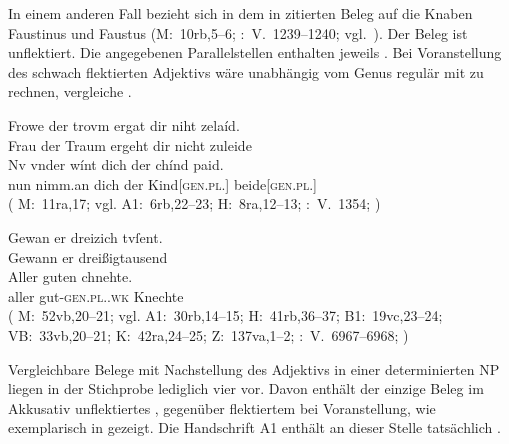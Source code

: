 In einem anderen Fall bezieht sich in dem in  zitierten
Beleg   auf die Knaben Faustinus und Faustus
(M:~10rb,5--6; \KC:~V.~1239--1240; vgl.~\cite[104]{schroeder1895}). Der Beleg
ist unflektiert. Die angegebenen Parallelstellen enthalten
jeweils  . Bei Voranstellung des
schwach flektierten Adjektivs wäre unabhängig vom
Genus regulär mit  zu rechnen, vergleiche
.

\begin{exe}
\ex \label{ex:chindpaid}
\begin{xlist}
	\ex \label{ex:chindpaid_1}
		\gll Frowe der trovm ergat dir niht zelaíd. \\
			Frau der Traum ergeht dir nicht zuleide \\
	\sn \gll Nv {vnder wínt} dich der chínd paid. \\
			nun nimm.an dich der Kind[\textsc{gen.pl.\NeutM}]
			beide[\textsc{gen.pl.\NeutM}] \\
		\trans {}
			(%
				M:~11ra,17; vgl.
				A1:~6rb,22--23;
				H:~8ra,12--13;
				\KC:~V.~1354;
				\cite[106]{schroeder1895}%
			)

	\ex \label{ex:chindpaid_2}
		\gll Gewan er {dreizich tvſent}. \\
			Gewann er dreißigtausend \\
	\sn \gll Aller guten chnehte. \\
			aller gut-\textsc{gen.pl.\MascM.wk} Knechte \\
		\trans {}
			(%
				M:~52vb,20--21; vgl.
				A1:~30rb,14--15;
				H:~41rb,36--37;
				B1:~19vc,23--24;
				VB:~33vb,20--21;
				K:~42ra,24--25;
				Z:~137va,1--2;
				\KC:~V.~6967--6968;
				\cite[209]{schroeder1895}%
			)
\end{xlist}
\end{exe}

Vergleichbare Belege mit Nachstellung des Adjektivs in
einer determinierten NP liegen in der Stichprobe
lediglich vier vor. Davon enthält der einzige Beleg im Akkusativ
 unflektiertes  , gegenüber flektiertem
  bei Voranstellung, wie exemplarisch in
 gezeigt. Die Handschrift A1 enthält an dieser Stelle
tatsächlich  .

